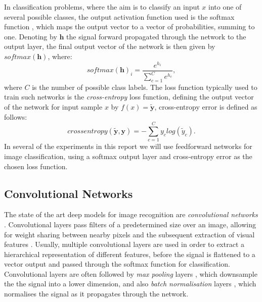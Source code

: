 In classification problems, where the aim is to classify an input $x$ into one of several possible classes, the output activation function used is the softmax function \cite{Theodoridis2009}, which maps the output vector to a vector of probabilities, summing to one. Denoting by $\mathbf{h}$ the signal forward propagated through the network to the output layer, the final output vector of the network is then given by $softmax(\mathbf{h})$, where:
\begin{equation}
softmax(\mathbf{h})_i = \frac{e^{h_i}}{\sum_{c=1}^Ce^{h_c}},
\end{equation}
where $C$ is the number of possible class labels. The loss function typically used to train such networks is the \textit{cross-entropy} loss function, defining the output vector of the network for input sample $x$ by $f(x) = \tilde{\mathbf{y}}$, cross-entropy error is defined as follows:
\begin{equation}
cross entropy(\tilde{\mathbf{y}},\mathbf{y}) = - \sum_{c=1}^{C} y_{c} log(\tilde{y}_{c}).
\end{equation}
In several of the experiments in this report we will use feedforward networks for image classification, using a softmax output layer and cross-entropy error as the chosen loss function. 

\subsection{Convolutional Networks}\label{sec:convnets}
The state of the art deep models for image recognition are \textit{convolutional networks} \cite{lecun2015deep} \cite{bengio2012practical}. Convolutional layers pass filters of a predetermined size over an image, allowing for weight sharing between nearby pixels and the subsequent extraction of visual features \cite{lecun2015deep}. Usually, multiple convolutional layers are used in order to extract a hierarchical representation of different features, before the signal is flattened to a vector output and passed through the softmax function for classification. Convolutional layers are often followed by \textit{max pooling} layers \cite{nagi2011max}, which downsample the the signal into a lower dimension, and also \textit{batch normalisation} layers \cite{ioffe2015batch}, which normalises the signal as it propagates through the network. 

